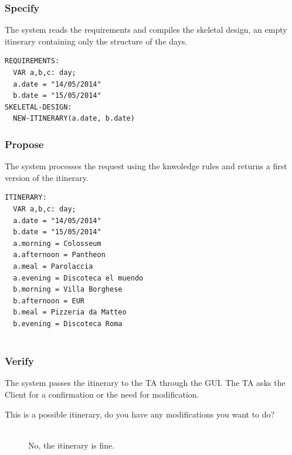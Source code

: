 \documentclass[11pt]{article} %
\begin{document}
\subsubsection{Specify}
The system reads the requirements and compiles the skeletal design, an empty itinerary containing only the structure of the days.

\begin{lstlisting}[breaklines=true,mathescape=true]
REQUIREMENTS:
  VAR a,b,c: day;
  a.date = "14/05/2014"
  b.date = "15/05/2014"
SKELETAL-DESIGN:
  NEW-ITINERARY(a.date, b.date)
\end{lstlisting}

\subsubsection{Propose}
The system processes the request using the knwoledge rules and returns a first version of the itinerary.

\begin{lstlisting}[breaklines=true,mathescape=true]
ITINERARY:
  VAR a,b,c: day;
  a.date = "14/05/2014"
  b.date = "15/05/2014"
  a.morning = Colosseum
  a.afternoon = Pantheon
  a.meal = Parolaccia
  a.evening = Discoteca el muendo
  b.morning = Villa Borghese
  b.afternoon = EUR
  b.meal = Pizzeria da Matteo
  b.evening = Discoteca Roma
  
\end{lstlisting}

\subsubsection{Verify}
The system passes the itinerary to the TA through the GUI. The TA asks the Client for a confirmation or the need for modification.

\begin{description}
  \item[This is a possible itinerary, do you have any modifications you want to do?] \hfill \\
  No, the itinerary is fine.
\end{description}




\clearpage
\end{document}
